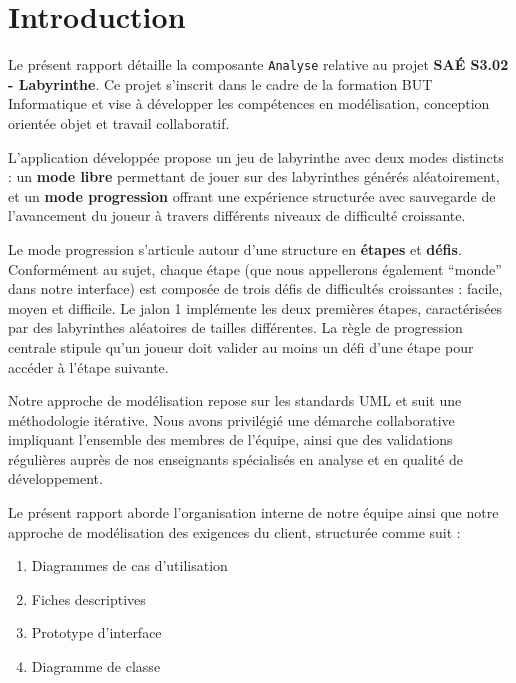 \documentclass{butexFR}
\begin{document}
\fairepagedegarde
\fairemarges
\tabledematieres



\section{Introduction}

Le présent rapport détaille la composante \texttt{Analyse} relative au projet \textbf{SAÉ S3.02 - Labyrinthe}. Ce projet s'inscrit dans le cadre de la formation BUT Informatique et vise à développer les compétences en modélisation, conception orientée objet et travail collaboratif.

L'application développée propose un jeu de labyrinthe avec deux modes distincts : un \textbf{mode libre} permettant de jouer sur des labyrinthes générés aléatoirement, et un \textbf{mode progression} offrant une expérience structurée avec sauvegarde de l'avancement du joueur à travers différents niveaux de difficulté croissante.

Le mode progression s'articule autour d'une structure en \textbf{étapes} et \textbf{défis}. Conformément au sujet, chaque étape (que nous appellerons également ``monde'' dans notre interface) est composée de trois défis de difficultés croissantes : facile, moyen et difficile. Le jalon 1 implémente les deux premières étapes, caractérisées par des labyrinthes aléatoires de tailles différentes. La règle de progression centrale stipule qu'un joueur doit valider au moins un défi d'une étape pour accéder à l'étape suivante.

Notre approche de modélisation repose sur les standards UML et suit une méthodologie itérative. Nous avons privilégié une démarche collaborative impliquant l'ensemble des membres de l'équipe, ainsi que des validations régulières auprès de nos enseignants spécialisés en analyse et en qualité de développement.

Le présent rapport aborde l'organisation interne de notre équipe ainsi que notre approche de modélisation des exigences du client, structurée comme suit :

\begin{enumerate}
    \item Diagrammes de cas d'utilisation
    \item Fiches descriptives
    \item Prototype d'interface
    \item Diagramme de classe
\end{enumerate}
\end{document}
